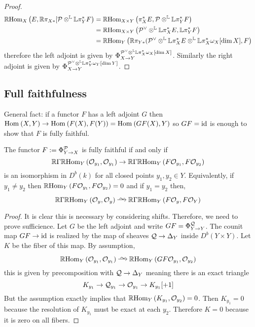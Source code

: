 \documentclass[12pt]{article}
\begin{document}
\begin{proof}
\begin{align*}
\mathbb{R} \mathrm{Hom}_{X} \left( E, \mathbb{R} \pi_{X*} [\mathcal{P} \otimes^{\mathbb{L}} \mathbb{L} \pi_Y^* F \right) &= \mathbb{R} \mathrm{Hom}_{X \times Y} \left( \pi_{X}^* E, \mathcal{P} \otimes^{\mathbb{L}} \mathbb{L} \pi_Y^* F \right) 
\\
& = \mathbb{R} \mathrm{Hom}_{X \times Y} \left( \mathcal{P}^\vee \otimes^{\mathbb{L}} \mathbb{L} \pi_X^* E, \mathbb{L} \pi_Y^* F \right)  
\\
& = \mathbb{R} \mathrm{Hom}_{Y} \left( \mathbb{R} \pi_{Y*} (\mathcal{P}^\vee \otimes^{\mathbb{L}} \mathbb{L} \pi_X^* E \otimes^{\mathbb{L}} \mathbb{L} \pi_X^* \omega_X[\dim{X}], F \right) 
\end{align*}
therefore the left adjoint is given by $\Phi^{\mathcal{P}^\vee \otimes^{\mathbb{L}} \mathbb{L} \pi_X^* \omega_X[\dim{X}]}_{X \to Y}$. Similarly the right adjoint is given by $\Phi^{\mathcal{P}^\vee \otimes^{\mathbb{L}} \mathbb{L} \pi_Y^* \omega_Y[\dim{Y}]}_{X \to Y}$.
\end{proof}

\subsection{Full faithfulness}

General fact: if a functor $F$ has a left adjoint $G$ then $\mathrm{Hom}_{} \left( X, Y \right) \to \mathrm{Hom}_{} \left( F(X), F(Y) \right) = \mathrm{Hom}_{} \left( GF(X), Y \right)$ so $GF = \mathrm{id}$ is enough to show that $F$ is fully faithful. 

\begin{theorem}
The functor $F := \Phi_{Y \to X}^{\mathcal{P}}$ is fully faithful if and only if 
\[ \mathbb{R} \Gamma \mathbb{R} \mathrm{Hom}_{Y} \left( \mathcal{O}_{y_1}, \mathcal{O}_{y_1} \right) \to \mathbb{R} \Gamma \mathbb{R} \mathrm{Hom}_{Y} \left( F \mathcal{O}_{y_1}, F \mathcal{O}_{y_2} \right) \]
is an isomorphism in $D^b(k)$ for all closed points $y_1, y_2 \in Y$. Equivalently, if $y_1 \neq y_2$ then $\mathbb{R} \mathrm{Hom}_{Y} \left( F \mathcal{O}_{y_1}, F \mathcal{O}_{y_2} \right) = 0$ and if $y_1 = y_2$ then,
\[ \RR \Gamma \RR \Hom{Y}{\struct{y}}{\struct{y}} \iso \RR \Gamma \RR \Hom{Y}{F \struct{y}}{F \struct{Y}} \]
\end{theorem}

\begin{proof}
It is clear this is necessary by considering shifts. Therefore, we need to prove sufficience. Let $G$ be the left adjoint and write $GF = \Phi^{\mathcal{Q}}_{Y \to Y}$. The counit map $GF \to \mathrm{id}$ is realized by the map of sheaves $\mathcal{Q} \to \Delta_{Y}$ inside $D^b(Y \times Y)$. Let $K$ be the fiber of this map. By assumption, 
\[ \RR \Hom{Y}{\struct{y_1}}{\struct{y_1}} \iso \RR \Hom{Y}{GF \struct{y_1}}{\struct{y_2}} \] 
this is given by precomposition with $\mathcal{Q} \to \Delta_{Y}$ meaning there is an exact triangle
\[ K_{y_1} \to \mathcal{Q}_{y_1} \to \mathcal{O}_{y_1} \to K_{y_1}[+1] \]
But the assumption exactly implies that $\mathbb{R} \mathrm{Hom}_{Y} \left( K_{y_1}, \mathcal{O}_{y_2} \right) = 0$. Then $K_{y_1} = 0$ because the resolution of $K_{y_1}$ must be exact at each $y_2$. Therefore $K = 0$ because it is zero on all fibers. 
\end{proof}
\end{document}

